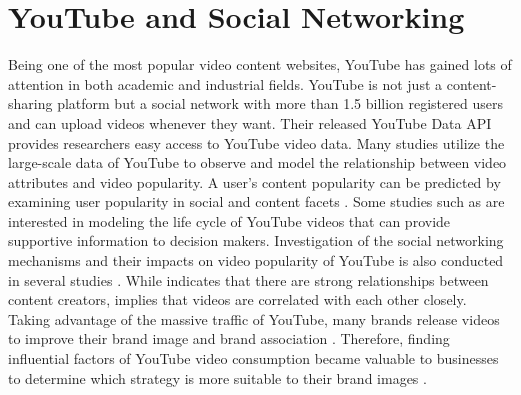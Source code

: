 \section{YouTube and Social Networking}

Being one of the most popular video content websites, YouTube has gained lots of attention in both academic and industrial fields. YouTube is not just a content-sharing platform but a social network with more than 1.5 billion registered users and can upload videos whenever they want. Their released YouTube Data API provides researchers easy access to YouTube video data. Many studies utilize the large-scale data of YouTube to observe and model the relationship between video attributes and video popularity. A user's content popularity can be predicted by examining user popularity in social and content facets \cite{37738}. Some studies such as \cite{10.1145/1298306.1298309} are interested in modeling the life cycle of YouTube videos that can provide supportive information to decision makers. Investigation of the social networking mechanisms and their impacts on video popularity of YouTube is also conducted in several studies \cite{4539688, 37738}. While \cite{37738} indicates that there are strong relationships between content creators, \cite{4539688} implies that videos are correlated with each other closely. Taking advantage of the massive traffic of YouTube, many brands release videos to improve their brand image and brand association \cite{Febriyantoro2020ExploringYM}. Therefore, finding influential factors of YouTube video consumption became valuable to businesses to determine which strategy is more suitable to their brand images \cite{article}.


